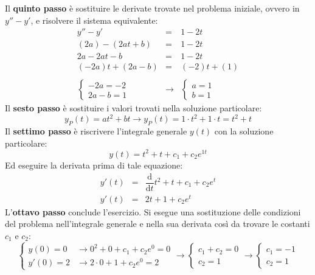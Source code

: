 \documentclass[a4paper]{article}
\begin{document}
	\noindent
	Il \textbf{quinto passo} è sostituire le derivate trovate nel problema iniziale, ovvero in $y''-y'$, e risolvere il sistema equivalente:
	\begin{equation*}
		\begin{array}{rcl}
			y'' - y' &=& 1 - 2t \\
			\left(2a\right) - \left(2at+b\right) &=& 1-2t \\
			2a -2at -b &=& 1-2t \\
			\left(-2a\right)t + \left(2a-b\right) &=& \left(-2\right)t + \left(1\right) \\
			\\
			\begin{cases}
				-2a = -2 \\
				2a - b = 1
			\end{cases} &\longrightarrow&
			\begin{cases}
				a = 1 \\
				b = 1
			\end{cases}
		\end{array}
	\end{equation*}
	Il \textbf{sesto passo} è sostituire i valori trovati nella soluzione particolare:
	\begin{equation*}
		y_{P}\left(t\right) = at^{2} + bt \rightarrow y_{P}\left(t\right) = 1 \cdot t^{2} + 1 \cdot t = t^{2} + t
	\end{equation*}
	Il \textbf{settimo passo} è riscrivere l'integrale generale $y\left(t\right)$ con la soluzione particolare:
	\begin{equation*}
		y\left(t\right) = t^{2} + t + c_{1} + c_{2}e^{1t}
	\end{equation*}
	Ed eseguire la derivata prima di tale equazione:
	\begin{equation*}
		\begin{array}{rcl}
			y'\left(t\right) &=& \dfrac{\mathrm{d}}{\mathrm{d}t} t^{2} + t + c_{1} + c_{2}e^{t} \\ [1em]
			y'\left(t\right) &=& 2t + 1 + c_{2}e^{t}
		\end{array}
	\end{equation*}
	L'\textbf{ottavo passo} conclude l'esercizio. Si esegue una sostituzione delle condizioni del problema nell'integrale generale e nella sua derivata così da trovare le costanti $c_{1}$ e $c_{2}$:
	\begin{equation*}
		\begin{cases}
			y\left(0\right) = 0 	&\longrightarrow 0^{2} + 0 + c_{1} + c_{2}e^{0} = 0 \\
			y'\left(0\right) = 2 	&\longrightarrow 2 \cdot 0 + 1 + c_{2}e^{0} = 2
		\end{cases}
		\longrightarrow
		\begin{cases}
			c_{1} + c_{2} = 0 \\
			c_{2} = 1
		\end{cases}
		\longrightarrow
		\begin{cases}
			c_{1} = -1 \\
			c_{2} = 1
		\end{cases}
	\end{equation*}
\end{document}
